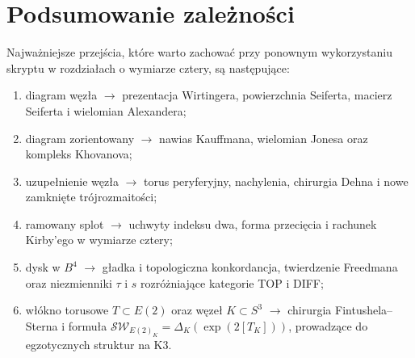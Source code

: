 \documentclass[11pt,a4paper]{report}
\numberwithin{equation}{section}
\theoremstyle{plain}
\theoremstyle{definition}
\theoremstyle{remark}
\begin{document}
\section*{Podsumowanie zależności}
Najważniejsze przejścia, które warto zachować przy ponownym
wykorzystaniu skryptu w rozdziałach o wymiarze cztery, są następujące:
\begin{enumerate}[label=(\roman*)]
\item diagram węzła $\longrightarrow$ prezentacja Wirtingera,
powierzchnia Seiferta, macierz Seiferta i wielomian Alexandera;
\item diagram zorientowany $\longrightarrow$ nawias Kauffmana,
wielomian Jonesa oraz kompleks Khovanova;
\item uzupełnienie węzła $\longrightarrow$ torus peryferyjny,
nachylenia, chirurgia Dehna i nowe zamknięte trójrozmaitości;
\item ramowany splot $\longrightarrow$ uchwyty indeksu dwa,
forma przecięcia i rachunek Kirby'ego w wymiarze cztery;
\item dysk w $B^4$ $\longrightarrow$ gładka i topologiczna
konkordancja, twierdzenie Freedmana oraz niezmienniki
$\tau$ i $s$ rozróżniające kategorie TOP i DIFF;
\item włókno torusowe $T\subset E(2)$ oraz węzeł $K\subset S^3$
$\longrightarrow$ chirurgia Fintushela--Sterna i formuła
$\mathcal{SW}_{E(2)_K}=\Delta_K(\exp(2[T_K]))$,
prowadzące do egzotycznych struktur na K3.
\end{enumerate}

\end{document}
